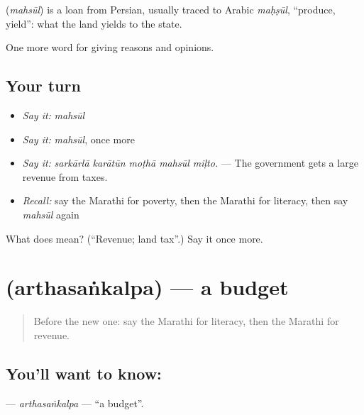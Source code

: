 \begin{cousinweb}
\textbf{} (\emph{mahsūl}) is a loan from Persian, usually traced to Arabic \emph{maḥṣūl}, \textquotedblleft{}produce, yield\textquotedblright{}: what the land yields to the state.
\end{cousinweb}

\begin{grammarlens}[title={What you've built}]
One more word for giving reasons and opinions.
\end{grammarlens}

\subsection*{Your turn}
\begin{itemize}
\raggedright
  \item \emph{Say it:} \emph{mahsūl}
  \item \emph{Say it:} \emph{mahsūl}, once more
  \item \emph{Say it:} \emph{sarkārlā karātūn moṭhā mahsūl miḷto.} — The government gets a large revenue from taxes.
  \item \emph{Recall:} say the Marathi for poverty, then the Marathi for literacy, then say \emph{mahsūl} again
\end{itemize}

\begin{tcolorbox}[breakable,colback=teal!4,colframe=teal!35!black,title={Before you move on}]
What does  mean? (\textquotedblleft{}Revenue; land tax\textquotedblright{}.) Say it once more.
\end{tcolorbox}
\section[\texorpdfstring{\mr{अर्थसंकल्प} (arthasaṅkalpa)}{अर्थसंकल्प (arthasaṅkalpa)}]{ (arthasaṅkalpa) — a budget}

\label{lesson:MR-C361-arthasankalpa}



\begin{quote}
Before the new one: say the Marathi for literacy, then the Marathi for revenue.
\end{quote}

\subsection*{You'll want to know: }
\textbf{} — \emph{arthasaṅkalpa} — \textquotedblleft{}a budget\textquotedblright{}.

